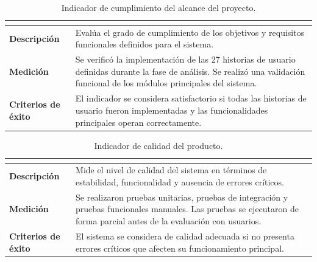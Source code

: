 \begin{table}[H]
\centering
\caption{Indicador de cumplimiento del alcance del proyecto.}
\label{tab:ind_alcance}
\footnotesize
\renewcommand{\arraystretch}{1.25}
\begin{tabularx}{\textwidth}{|>{\bfseries}p{3.2cm}|X|}
\hline
\rowcolor{headblue}\multicolumn{2}{|c|}{\textbf{Cumplimiento del alcance}}\\\hline
Descripción & Evalúa el grado de cumplimiento de los objetivos y requisitos funcionales definidos para el sistema. \\\hline
Medición & Se verificó la implementación de las 27 historias de usuario definidas durante la fase de análisis. Se realizó una validación funcional de los módulos principales del sistema. \\\hline
Criterios de éxito & El indicador se considera satisfactorio si todas las historias de usuario fueron implementadas y las funcionalidades principales operan correctamente. \\\hline
\end{tabularx}
\end{table}
\elaboracion

\begin{table}[H]
\centering
\caption{Indicador de calidad del producto.}
\label{tab:ind_calidad}
\footnotesize
\renewcommand{\arraystretch}{1.25}
\begin{tabularx}{\textwidth}{|>{\bfseries}p{3.2cm}|X|}
\hline
\rowcolor{headblue}\multicolumn{2}{|c|}{\textbf{Calidad del sistema}}\\\hline
Descripción & Mide el nivel de calidad del sistema en términos de estabilidad, funcionalidad y ausencia de errores críticos. \\\hline
Medición & Se realizaron pruebas unitarias, pruebas de integración y pruebas funcionales manuales. Las pruebas se ejecutaron de forma parcial antes de la evaluación con usuarios. \\\hline
Criterios de éxito & El sistema se considera de calidad adecuada si no presenta errores críticos que afecten su funcionamiento principal. \\\hline
\end{tabularx}
\end{table}
\elaboracion

